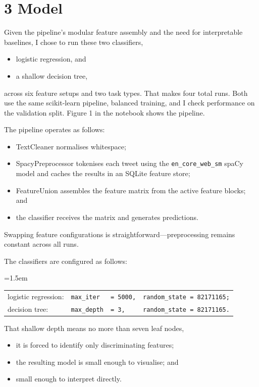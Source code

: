 \documentclass[12pt]{article}
\begin{document}
\section*{3 Model}



Given the pipeline's modular feature assembly and the need for interpretable baselines, I chose to run these two classifiers,
\begin{itemize}
  \item logistic regression, and
  \item a shallow decision tree,
\end{itemize}
across six feature setups and two task types. That makes four total runs. Both use the same scikit-learn pipeline, balanced training, and I  check performance on the validation split. Figure 1 in the notebook shows the pipeline.

The pipeline operates as follows:
\begin{itemize}
  \item TextCleaner normalises whitespace;
  \item SpacyPreprocessor tokenises each tweet using the \texttt{en\_core\_web\_sm} spaCy model and caches the results in an SQLite feature store;
  \item FeatureUnion assembles the feature matrix from the active feature blocks; and
  \item the classifier receives the matrix and generates predictions.
\end{itemize}
Swapping feature configurations is straightforward---preprocessing remains constant across all runs.

The classifiers are configured as follows:

{\leftskip=1.5em
\begin{tabular}{@{\textbullet\quad}llll@{}}
logistic regression: & \texttt{max\_iter}  & \texttt{= 5000,} & \texttt{random\_state = 82171165;} \\
decision tree:       & \texttt{max\_depth} & \texttt{= 3,}    & \texttt{random\_state = 82171165.} \\
\end{tabular}\par}
That shallow depth means no more than seven leaf nodes,

\begin{itemize}

  \item it is forced to identify only discriminating features;

  \item the resulting model is 
  small enough to visualise; and

  \item small enough to interpret directly.

\end{itemize}
\end{document}
